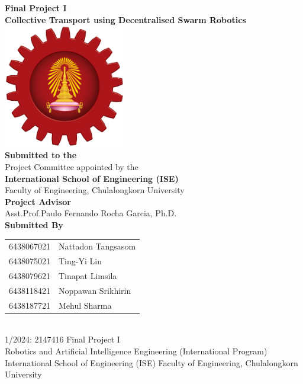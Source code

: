 \begin{titlepage}
    \centering

    {\LARGE \textbf{Final Project I}}\\[1cm]
    {\Huge \textbf{Collective Transport using Decentralised Swarm Robotics}}\\[1cm]

    \includegraphics[width=0.4\textwidth]{midpoint_report/assets/images/ise_logo.png}\\[1cm] %
    
    \textbf{Submitted to the}\\[0.1cm]
    Project Committee appointed by the\\
    \textbf{International School of Engineering (ISE)}\\
    Faculty of Engineering, Chulalongkorn University\\[1cm]

    \textbf{Project Advisor}\\[0.1cm]
    Asst.Prof.Paulo Fernando Rocha Garcia, Ph.D.\\[1cm]

    \textbf{Submitted By}\\[0.5cm]
    \begin{tabular}{rl}
        6438067021 & Nattadon Tangsasom \\
        6438075021 & Ting-Yi Lin \\
        6438079621 & Tinapat Limsila \\
        6438118421 & Noppawan Srikhirin \\
        6438187721 & Mehul Sharma \\
    \end{tabular}\\[1cm]
    1/2024: 2147416 Final Project I\\
    Robotics and Artificial Intelligence Engineering (International Program)\\
    International School of Engineering (ISE) Faculty of Engineering, Chulalongkorn University

\end{titlepage}
